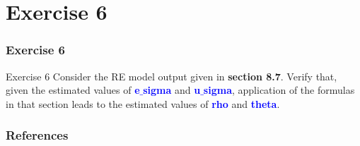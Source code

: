 \documentclass[11pt, aspectratio=169]{beamer}
\begin{document}
	\section{Exercise 6}
		\begin{frame}
			\frametitle{Exercise 6}
			\begin{block}{Exercise 6}
				Consider the RE model output given in \textcolor{red!50}{\textbf{section 8.7}}. Verify that, given
				the estimated values of \textcolor{blue}{\textbf{e$\_$sigma}} and \textcolor{blue}{\textbf{u$\_$sigma}}, application of the
				formulas in that section leads to the estimated values of \textcolor{blue}{\textbf{rho}} and
				\textcolor{blue}{\textbf{theta}}.
			\end{block}
		\end{frame}
	\begin{frame}[t,allowframebreaks]
		\frametitle{References}
		
		
		\nocite{cameron2022-I}
		\nocite{cameron2022-II}
	\end{frame}
	\begin{frame}
		\maketitle
	\end{frame}
\end{document}
